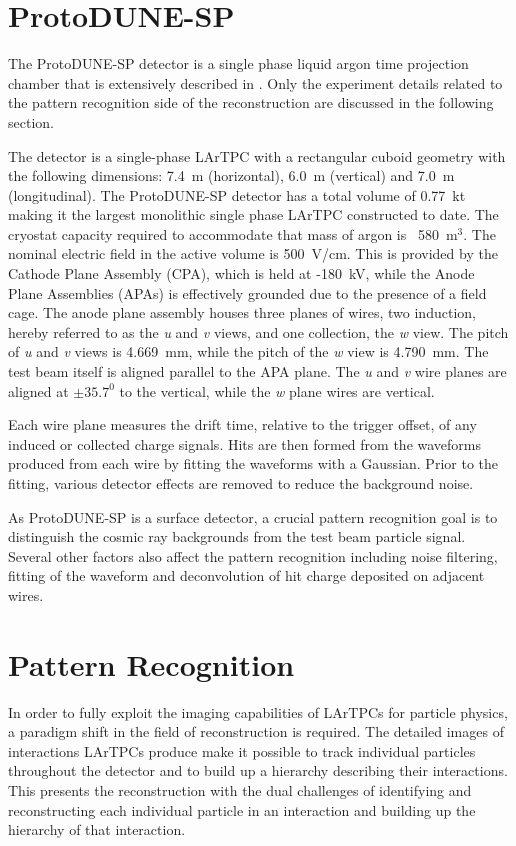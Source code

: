 \section{ProtoDUNE-SP}
\label{sec:protodunesp}
The ProtoDUNE-SP detector is a single phase liquid argon time projection chamber that is extensively described in \cite{pdtdr}.  Only the experiment details related to the pattern recognition side of the reconstruction are discussed in the following section.

The detector is a single-phase LArTPC with a rectangular cuboid geometry with the following dimensions: 7.4~m (horizontal), 6.0~m (vertical) and 7.0~m (longitudinal).  The ProtoDUNE-SP detector has a total volume of 0.77~kt making it the largest monolithic single phase LArTPC constructed to date.  The cryostat capacity required to accommodate that mass of argon is ~580~$ \text{m}^{3}$.  The nominal electric field in the active volume is 500~V/cm.  This is provided by the Cathode Plane Assembly (CPA), which is held at -180~kV, while the Anode Plane Assemblies (APAs) is effectively grounded due to the presence of a field cage.  The anode plane assembly houses three planes of wires, two induction, hereby referred to as the \textit{u} and \textit{v} views, and one collection, the \textit{w} view.  The pitch of \textit{u} and \textit{v} views is 4.669~mm, while the pitch of the \textit{w} view is 4.790~mm.  The test beam itself is aligned parallel to the APA plane.  The \textit{u} and \textit{v} wire planes are aligned at $\pm35.7^{0}$ to the vertical, while the \textit{w} plane wires are vertical.  

Each wire plane measures the drift time, relative to the trigger offset, of any induced or collected charge signals.  Hits are then formed from the waveforms produced from each wire by fitting the waveforms with a Gaussian.  Prior to the fitting, various detector effects are removed to reduce the background noise.  

As ProtoDUNE-SP is a surface detector, a crucial pattern recognition goal is to distinguish the cosmic ray backgrounds from the test beam particle signal.  Several other factors also affect the pattern recognition including noise filtering, fitting of the waveform and deconvolution of hit charge deposited on adjacent wires.  


\section{Pattern Recognition}
\label{sec:patrec}
In order to fully exploit the imaging capabilities of LArTPCs for particle physics, a paradigm shift in the field of reconstruction is required.  The detailed images of interactions LArTPCs produce make it possible to track individual particles throughout the detector and to build up a hierarchy describing their interactions.  This presents the reconstruction with the dual challenges of identifying and reconstructing each individual particle in an interaction and building up the hierarchy of that interaction.

